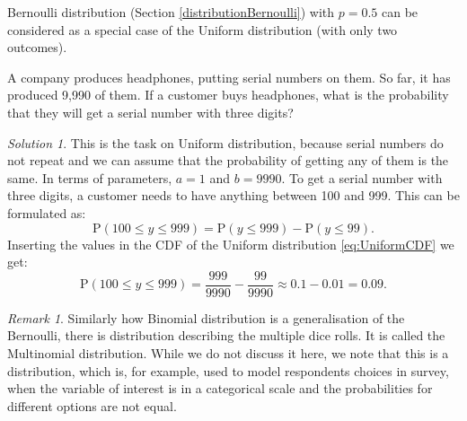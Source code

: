 \documentclass[
]{book}
\theoremstyle{definition}
\theoremstyle{definition}
\theoremstyle{definition}
\theoremstyle{definition}
\theoremstyle{remark}
\newtheorem*{remark}{Remark}
\newtheorem*{solution}{Solution}
\begin{document}
Bernoulli distribution (Section \ref{distributionBernoulli}) with \(p=0.5\) can be considered as a special case of the Uniform distribution (with only two outcomes).

A company produces headphones, putting serial numbers on them. So far, it has produced 9,990 of them. If a customer buys headphones, what is the probability that they will get a serial number with three digits?

\begin{solution}
This is the task on Uniform distribution, because serial numbers do not repeat and we can assume that the probability of getting any of them is the same. In terms of parameters, \(a=1\) and \(b=9990\). To get a serial number with three digits, a customer needs to have anything between 100 and 999. This can be formulated as:
\begin{equation*}
    \mathrm{P}(100 \leq y \leq 999) = \mathrm{P}(y \leq 999) - \mathrm{P}(y \leq 99).
\end{equation*}
Inserting the values in the CDF of the Uniform distribution \eqref{eq:UniformCDF} we get:
\begin{equation*}
    \mathrm{P}(100 \leq y \leq 999) = \frac{999}{9990} - \frac{99}{9990} \approx 0.1 - 0.01 = 0.09.
\end{equation*}
\end{solution}

\begin{remark}
Similarly how Binomial distribution is a generalisation of the Bernoulli, there is distribution describing the multiple dice rolls. It is called the Multinomial distribution. While we do not discuss it here, we note that this is a distribution, which is, for example, used to model respondents choices in survey, when the variable of interest is in a categorical scale and the probabilities for different options are not equal.
\end{remark}
\end{document}
